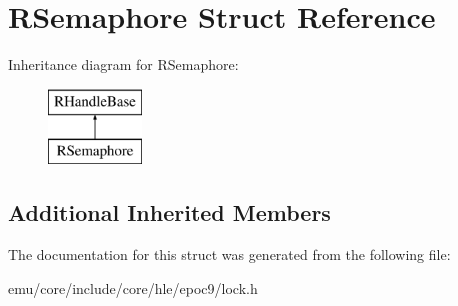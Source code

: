 \hypertarget{struct_r_semaphore}{}\section{R\+Semaphore Struct Reference}
\label{struct_r_semaphore}
Inheritance diagram for R\+Semaphore\+:\begin{figure}[H]
\begin{center}
\leavevmode
\includegraphics[height=2.000000cm]{struct_r_semaphore}
\end{center}
\end{figure}
\subsection*{Additional Inherited Members}


The documentation for this struct was generated from the following file\+:\begin{DoxyCompactItemize}
\item 
emu/core/include/core/hle/epoc9/lock.\+h\end{DoxyCompactItemize}
